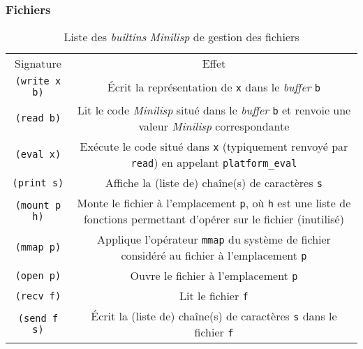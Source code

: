 \documentclass[c, 11pt, handout, xcolor=table]{beamer}
\newcommand{\codeC}[1]{\texttt{#1}}
\newcommand{\codeLisp}[1]{\texttt{#1}}
\newcommand{\foreign}[1]{\emph{#1}}
\begin{document}
\begin{frame}
 \frametitle{Fichiers}
 
 \begin{table}[H]
  \centering
  \begin{tabularx}{\linewidth}{|C|C|}
    \hline
    Signature & Effet \tabularnewline
    \hhline{|=|=|}
    \codeLisp{(write x b)} & Écrit la représentation de \codeLisp{x} dans le \foreign{buffer} \codeLisp{b} \tabularnewline
    \hline
    \codeLisp{(read b)} & Lit le code \foreign{Minilisp} situé dans le \foreign{buffer} \codeLisp{b} et renvoie une valeur \foreign{Minilisp} correspondante \tabularnewline
    \codeLisp{(eval x)} & Exécute le code situé dans \codeLisp{x} (typiquement renvoyé par \codeLisp{read}) en appelant \codeC{platform_eval} \tabularnewline
    \hhline{|=|=|}
    \codeLisp{(print s)} & Affiche la (liste de) chaîne(s) de caractères \codeLisp{s} \tabularnewline
    \hline
    \codeLisp{(mount p h)} & Monte le fichier à l'emplacement \codeLisp{p}, où \codeLisp{h} est une liste de fonctions permettant d'opérer sur le fichier (inutilisé) \tabularnewline
    \hline
    \codeLisp{(mmap p)} & Applique l'opérateur \codeLisp{mmap} du système de fichier considéré au fichier à l'emplacement \codeLisp{p} \tabularnewline
    \hline
    \codeLisp{(open p)} & Ouvre le fichier à l'emplacement \codeLisp{p} \tabularnewline
    \hline
    \codeLisp{(recv f)} & Lit le fichier \codeLisp{f} \tabularnewline
    \hline
    \codeLisp{(send f s)} & Écrit la (liste de) chaîne(s) de caractères \codeLisp{s} dans le fichier \codeLisp{f} \tabularnewline
    \hline
  \end{tabularx}
  \caption{Liste des \foreign{builtins} \foreign{Minilisp} de gestion des fichiers}
 \end{table}
\end{frame}
\end{document}
